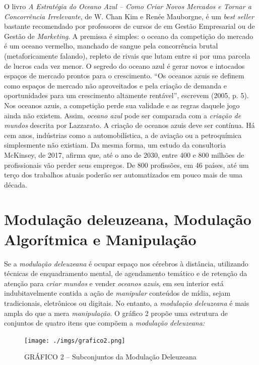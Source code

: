 O livro \emph{A Estratégia do Oceano Azul -- Como Criar Novos Mercados e
Tornar a Concorrência Irrelevante}, de W. Chan Kim e Renée Mauborgne, é
um \emph{best seller} bastante recomendado por professores de cursos de
 em Gestão Empresarial ou de Gestão de \emph{Marketing}. A premissa é
simples: o oceano da competição do mercado é um oceano vermelho,
manchado de sangue pela concorrência brutal (metaforicamente falando),
repleto de rivais que lutam entre si por uma parcela de lucros cada vez
menor. O segredo do oceano azul é gerar novos e intocados espaços de
mercado prontos para o crescimento. ``Os oceanos azuis se definem como
espaços de mercado não aproveitados e pela criação de demanda e
oportunidades para um crescimento altamente rentável'', escrevem (2005,
p. 5). Nos oceanos azuis, a competição perde sua validade e as regras
daquele jogo ainda não existem. Assim, \emph{oceano azul} pode ser
comparada com a \emph{criação de mundos} descrita por Lazzarato. A
criação de oceanos azuis deve ser contínua. Há cem anos, indústrias como
a automobilística, a de aviação ou a petroquímica simplesmente não
existiam. Da mesma forma, um estudo da consultoria McKinsey, de 2017,
afirma que, até o ano de 2030, entre 400 e 800 milhões de profissionais
vão perder seus empregos. De 800 profissões, em 46 países, até um terço
dos trabalhos atuais poderão ser automatizados em pouco mais de uma
década.

\section{Modulação deleuzeana, Modulação Algorítmica e Manipulação}

Se a \emph{modulação deleuzeana} é ocupar espaço nos cérebros à
distância, utilizando técnicas de enquadramento mental, de agendamento
temático e de retenção da atenção para \emph{criar mundos} e vender
\emph{oceanos azuis}, em seu interior está indubitavelmente contida a
ação de \emph{manipular} conteúdos de mídia, sejam tradicionais,
eletrônicos ou digitais. No entanto, a \emph{modulação deleuzeana} é
mais ampla do que a mera \emph{manipulação}. O gráfico 2 propõe uma
estrutura de conjuntos de quatro itens que compõem a \emph{modulação
deleuzeana:}



\begin{figure}[!ht]
\centering
  \texttt{[image: ./imgs/grafico2.png]}
\caption{GRÁFICO 2 -- Subconjuntos da Modulação Deleuzeana}
 \end{figure}

